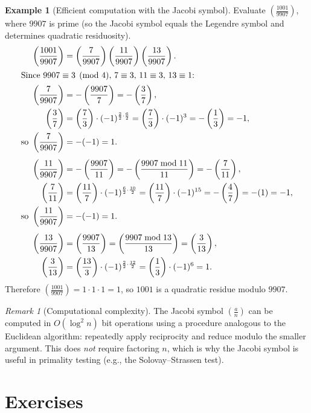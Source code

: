 \documentclass[12pt,a4paper,openany]{book}
\theoremstyle{definition}
\newtheorem{example}[definition]{Example}
\theoremstyle{plain}
\theoremstyle{remark}
\newtheorem{remark}[definition]{Remark}
\newcommand{\jacobi}[2]{\left(\frac{#1}{#2}\right)}
\begin{document}
\begin{example}[Efficient computation with the Jacobi symbol]
\label{ex:jacobi-computation}
Evaluate $\jacobi{1001}{9907}$, where $9907$ is prime (so the Jacobi symbol
equals the Legendre symbol and determines quadratic residuosity).
\begin{align*}
  \jacobi{1001}{9907}
  &= \jacobi{7}{9907}\jacobi{11}{9907}\jacobi{13}{9907}. \\
\intertext{Since $9907 \equiv 3 \pmod{4}$, $7 \equiv 3$, $11 \equiv 3$, $13 \equiv 1$:}
  \jacobi{7}{9907} &= -\jacobi{9907}{7} = -\jacobi{3}{7},\\
  \jacobi{3}{7} &= \jacobi{7}{3} \cdot (-1)^{\frac{2}{2}\cdot\frac{6}{2}}
    = \jacobi{7}{3}\cdot(-1)^3 = -\jacobi{1}{3} = -1,\\
  \text{so }\jacobi{7}{9907} &= -(-1) = 1.\\[4pt]
  \jacobi{11}{9907} &= -\jacobi{9907}{11} = -\jacobi{9907 \bmod 11}{11} = -\jacobi{7}{11},\\
  \jacobi{7}{11} &= \jacobi{11}{7}\cdot(-1)^{\frac{6}{2}\cdot\frac{10}{2}}
    = \jacobi{11}{7}\cdot(-1)^{15} = -\jacobi{4}{7} = -(1) = -1,\\
  \text{so }\jacobi{11}{9907} &= -(-1) = 1.\\[4pt]
  \jacobi{13}{9907} &= \jacobi{9907}{13} = \jacobi{9907 \bmod 13}{13} = \jacobi{3}{13},\\
  \jacobi{3}{13} &= \jacobi{13}{3}\cdot(-1)^{\frac{2}{2}\cdot\frac{12}{2}}
    = \jacobi{1}{3}\cdot(-1)^6 = 1.
\end{align*}
Therefore $\jacobi{1001}{9907} = 1 \cdot 1 \cdot 1 = 1$,
so $1001$ is a quadratic residue modulo $9907$.
\end{example}

\begin{remark}[Computational complexity]
\label{rem:jacobi-complexity}
The Jacobi symbol $\jacobi{a}{n}$ can be computed in $O(\log^2 n)$ bit operations
using a procedure analogous to the Euclidean algorithm: repeatedly apply reciprocity
and reduce modulo the smaller argument. This does \emph{not} require factoring $n$,
which is why the Jacobi symbol is useful in primality testing
(e.g., the Solovay--Strassen test).
\end{remark}

\section{Exercises}
\label{sec:qr-exercises}
\end{document}
